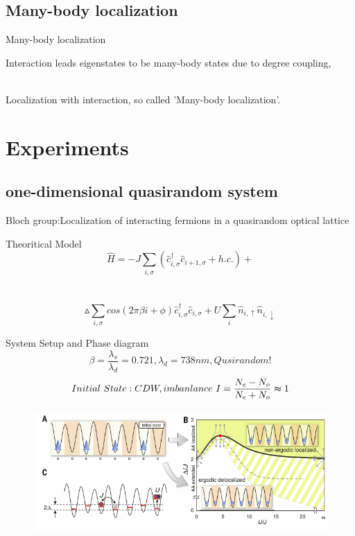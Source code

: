 \documentclass{beamer}
\begin{document}
\subsection{Many-body localization}
\begin{frame}{Many-body localization}

Interaction leads eigenstates to be many-body states due to degree coupling,\\~

Localization with interaction, so called 'Many-body localization'.

\end{frame}
\section{Experiments}
\subsection{one-dimensional quasirandom system}
\begin{frame}
Bloch group:Localization of interacting fermions in a quasirandom optical lattice
\begin{block}{Theoritical Model}
$$\hat{H}=-J\sum_{i,\sigma}(\hat{c}_{i,\sigma}^{\dagger}\hat{c}_{i+1,\sigma}+h.c.)+$$\\~
$$\vartriangle \sum_{i,\sigma}cos(2\pi\beta i+\phi)\hat{c}_{i,\sigma}^{\dagger}\hat{c}_{i,\sigma}+U\sum_{i}\hat{n}_{i,\uparrow}\hat{n}_{i,\downarrow}$$
\end{block}
\end{frame}

\begin{frame}{System Setup and Phase diagram}
$$\beta=\frac{\lambda_s}{\lambda_d}=0.721,\lambda_d= 738nm,Qusirandom!$$
$$Initial\ State:CDW,imbanlance\ I=\frac{N_e-N_o}{N_e+N_o}\thickapprox1 $$
\begin{figure}
\includegraphics[width=1\linewidth]{Phasediagram}
\end{figure}
\end{frame}
\end{document}
